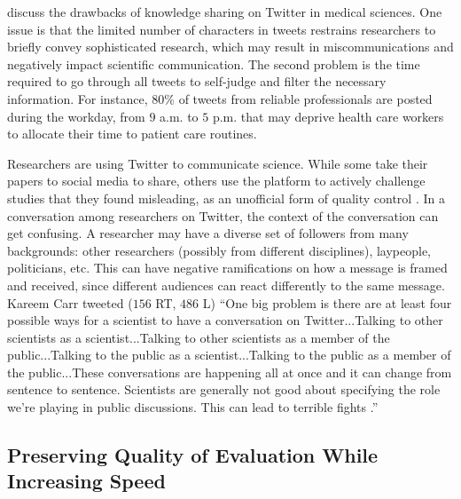 \documentclass[acmsmall,authordraft]{acmart}
\begin{document}
\citet{pershad2018social} discuss the drawbacks of knowledge sharing on Twitter in medical sciences. One issue is that the limited number of characters in tweets restrains researchers to briefly convey sophisticated research, which may result in miscommunications and negatively impact scientific communication. The second problem is the time required to go through all tweets to self-judge and filter the necessary information. For instance, $80$\% of tweets from reliable professionals are posted during the workday, from $9$ a.m. to $5$ p.m. that may deprive health care workers to allocate their time to patient care routines.

Researchers are using Twitter to communicate science. While some take their papers to social media to share, others use the platform to actively challenge studies that they found misleading, as an unofficial form of quality control \citep{Brainard2020drowning}. In a conversation among researchers on Twitter, the context of the conversation can get confusing. A researcher may have a diverse set of followers from many backgrounds: other researchers (possibly from different disciplines), laypeople, politicians, etc. This can have negative ramifications on how a message is framed and received, since different audiences can react differently to the same message. Kareem Carr tweeted ($156$ RT, $486$ L) ``One big problem is there are at least four possible ways for a scientist to have a conversation on Twitter...Talking to other scientists as a scientist...Talking to other scientists as a member of the public...Talking to the public as a scientist...Talking to the public as a member of the public...These conversations are happening all at once and it can change from sentence to sentence. Scientists are generally not good about specifying the role we're playing in public discussions. This can lead to terrible fights \citep{carr2020twitter}.'' 


\subsection{Preserving Quality of Evaluation While Increasing Speed}
\label{Preserving quality of evaluation while increasing speed}
\end{document}
